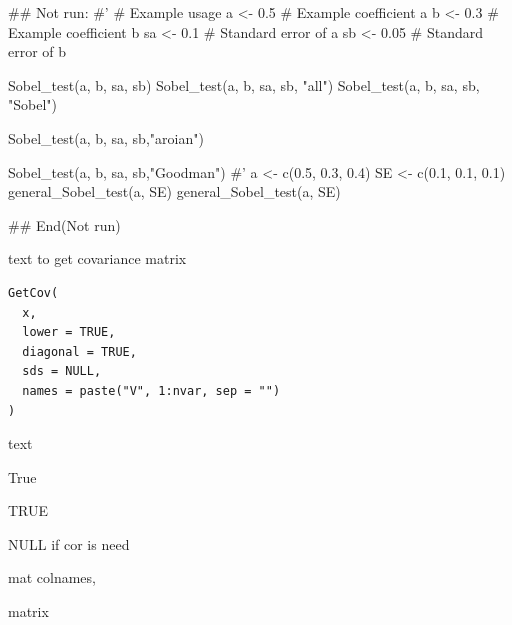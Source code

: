 \documentclass[a4paper]{book}
\begin{document}
%
\begin{Examples}
\begin{ExampleCode}

\#\# Not run: 
#'
# Example usage
a <- 0.5  # Example coefficient a
b <- 0.3  # Example coefficient b
sa <- 0.1 # Standard error of a
sb <- 0.05 # Standard error of b

Sobel_test(a, b, sa, sb)
Sobel_test(a, b, sa, sb, "all")
Sobel_test(a, b, sa, sb, "Sobel")

Sobel_test(a, b, sa, sb,"aroian")

Sobel_test(a, b, sa, sb,"Goodman")
#'
a <- c(0.5, 0.3, 0.4)
SE <- c(0.1, 0.1, 0.1)
general_Sobel_test(a, SE)
general_Sobel_test(a, SE)%



## End(Not run)
\end{ExampleCode}
\end{Examples}
%
\begin{Description}
text to get covariance matrix
\end{Description}
%
\begin{Usage}
\begin{verbatim}
GetCov(
  x,
  lower = TRUE,
  diagonal = TRUE,
  sds = NULL,
  names = paste("V", 1:nvar, sep = "")
)
\end{verbatim}
\end{Usage}
%
\begin{Arguments}
\begin{ldescription}
\item[\code{x}] text

\item[\code{lower}] True

\item[\code{diagonal}] TRUE

\item[\code{sds}] NULL if cor is need

\item[\code{names}] mat colnames,
\end{ldescription}
\end{Arguments}
%
\begin{Value}
matrix
\end{Value}
%
\end{document}
